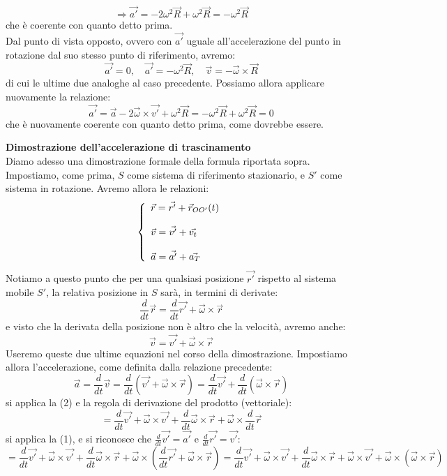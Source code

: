 \documentclass[a4paper,12pt]{article}
\begin{document}
$$ \Rightarrow \vec{a'} = -2\omega^2\vec{R} + \omega^2\vec{R} = -\omega^2\vec{R} $$
che è coerente con quanto detto prima. \\
Dal punto di vista opposto, ovvero con $\vec{a'}$ uguale all'accelerazione del punto in rotazione dal suo stesso punto
di riferimento, avremo:
$$ \vec{a'} = 0, \quad \vec{a'} = -\omega^2\vec{R}, \quad \vec{v} = -\vec{\omega} \times \vec{R} $$
di cui le ultime due analoghe al caso precedente. Possiamo allora applicare nuovamente la relazione:
$$ \vec{a'} = \vec{a} - 2\vec{\omega} \times \vec{v'} + \omega^2\vec{R} = -\omega^2\vec{R} + \omega^2\vec{R} = 0 $$
che è nuovamente coerente con quanto detto prima, come dovrebbe essere.
\par\medskip
\textbf{Dimostrazione dell'accelerazione di trascinamento} \\
Diamo adesso una dimostrazione formale della formula riportata sopra. Impostiamo, come prima, $S$ come sistema
di riferimento stazionario, e $S'$ come sistema in rotazione. Avremo allora le relazioni:
$$ 
\left\{\begin{array}{l}
    \vec{r} = \vec{r'} + \vec{r}_{OO'}(t) \cr \\
  \vec{v} = \vec{v'} + \vec{v_t} \cr \\
  \vec{a} = \vec{a'} + \vec{a_T}
\end{array}\right.
$$
Notiamo a questo punto che per una qualsiasi posizione $\vec{r'}$ rispetto al sistema mobile $S'$, la relativa posizione in $S$ sarà,
in termini di derivate:
\begin{equation} \frac{d}{dt}\vec{r} = \frac{d}{dt}\vec{r'} + \vec{\omega} \times \vec{r} \end{equation}
e visto che la derivata della posizione non è altro che la velocità, avremo anche:
\begin{equation} \vec{v} = \vec{v'} + \vec{\omega} \times \vec{r} \end{equation}
Useremo queste due ultime equazioni nel corso della dimostrazione. Impostiamo allora l'accelerazione, come definita
dalla relazione precedente:
$$ \vec{a} = \frac{d}{dt}\vec{v} = \frac{d}{dt}(\vec{v'} + \vec{\omega} \times \vec{r}) = \frac{d}{dt}\vec{v'} + \frac{d}{dt}(\vec{\omega} \times \vec{r})$$
si applica la (2) e la regola di derivazione del prodotto (vettoriale):
$$ =\frac{d}{dt}\vec{v'} + \vec{\omega} \times \vec{v'} + \frac{d}{dt}\vec{\omega} \times \vec{r} + \vec{\omega} \times \frac{d}{dt}\vec{r} $$
si applica la (1), e si riconosce che $\frac{d}{dt}\vec{v'} = \vec{a'}$ e $\frac{d}{dt}\vec{r'} = \vec{v'}$:
$$ = \frac{d}{dt}\vec{v'} + \vec{\omega} \times \vec{v'} + \frac{d}{dt}\vec{\omega} \times \vec{r} + \vec{\omega} \times (\frac{d}{dt}\vec{r'} + \vec{\omega} \times \vec{r}) = \frac{d}{dt}\vec{v'} + \vec{\omega} \times \vec{v'} + \frac{d}{dt}\vec{\omega} \times \vec{r} + \vec{\omega} \times \vec{v'} + \vec{\omega} \times (\vec{\omega} \times \vec{r}) $$
\end{document}
